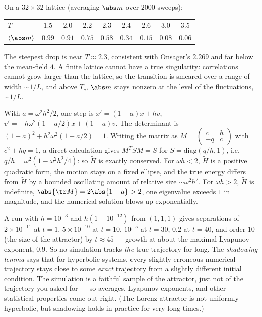  On a $32\times32$ lattice (averaging $\abs m$ over $2000$ sweeps):
\begin{center}
\small
\begin{tabular}{@{}lcccccccc@{}}
\toprule
$T$ & $1.5$ & $2.0$ & $2.2$ & $2.3$ & $2.4$ & $2.6$ & $3.0$ & $3.5$\\
$\langle\abs m\rangle$ & $0.99$ & $0.91$ & $0.75$ & $0.58$ & $0.34$ & $0.15$ & $0.08$ & $0.06$\\
\bottomrule
\end{tabular}
\end{center}
The steepest drop is near $T\approx2.3$, consistent with Onsager's $2.269$ and far below the mean-field $4$. A finite lattice cannot have a true singularity: correlations cannot grow larger than the lattice, so the transition is smeared over a range of width $\sim1/L$, and above $T_c$, $\abs m$ stays nonzero at the level of the fluctuations, $\sim1/L$.

 With $a = \omega^2h^2/2$, one step is $x' = (1-a)x + hv$, $v' = -h\omega^2(1-a/2)x + (1-a)v$. The determinant is $(1-a)^2 + h^2\omega^2(1-a/2) = 1$. Writing the matrix as $M = \begin{pmatrix}c&h\\-q&c\end{pmatrix}$ with $c^2 + hq = 1$, a direct calculation gives $M^TSM = S$ for $S = \mathrm{diag}(q/h, 1)$, i.e.\ $q/h = \omega^2(1-\omega^2h^2/4)$: so $\tilde H$ is exactly conserved. For $\omega h<2$, $\tilde H$ is a positive quadratic form, the motion stays on a fixed ellipse, and the true energy differs from $\tilde H$ by a bounded oscillating amount of relative size $\sim\omega^2h^2$. For $\omega h>2$, $\tilde H$ is indefinite, $\abs{\tr M} = 2\abs{1-a}>2$, one eigenvalue exceeds $1$ in magnitude, and the numerical solution blows up exponentially.

 A run with $h = 10^{-3}$ and $h(1+10^{-12})$ from $(1,1,1)$ gives separations of $2\times10^{-11}$ at $t = 1$, $5\times10^{-10}$ at $t=10$, $10^{-5}$ at $t = 30$, $0.2$ at $t = 40$, and order $10$ (the size of the attractor) by $t\approx45$ --- growth at about the maximal Lyapunov exponent, $0.9$. So no simulation tracks \emph{the} true trajectory for long. The \emph{shadowing lemma} says that for hyperbolic systems, every slightly erroneous numerical trajectory stays close to some \emph{exact} trajectory from a slightly different initial condition. The simulation is a faithful sample of the attractor, just not of the trajectory you asked for --- so averages, Lyapunov exponents, and other statistical properties come out right. (The Lorenz attractor is not uniformly hyperbolic, but shadowing holds in practice for very long times.)
